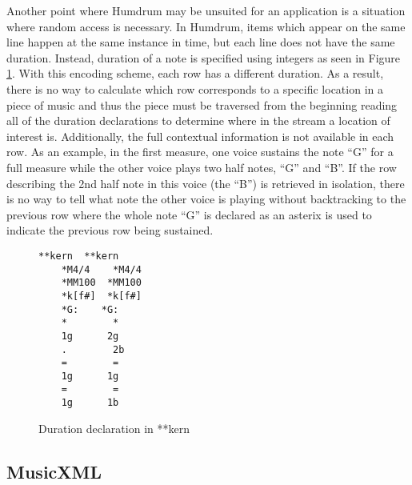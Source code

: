 Another point where Humdrum may be unsuited for an application is a situation where random access is necessary. In Humdrum, items which appear on the same line happen at the same instance in time, but each line does not have the same duration. Instead, duration of a note is specified using integers as seen in Figure \ref{fig:humdrumDuration}. With this encoding scheme, each row has a different duration. As a result, there is no way to calculate which row corresponds to a specific location in a piece of music and thus the piece must be traversed from the beginning reading all of the duration declarations to determine where in the stream a location of interest is. Additionally, the full contextual information is not available in each row. As an example, in the first measure, one voice sustains the note ``G'' for a full measure while the other voice plays two half notes, ``G'' and ``B''. If the row describing the 2nd half note in this voice (the ``B'') is retrieved in isolation, there is no way to tell what note the other voice is playing without backtracking to the previous row where the whole note ``G'' is declared as an asterix is used to indicate the previous row being sustained.

\begin{figure}
  \begin{center}
    \begin{Verbatim}[fontfamily=courier, xleftmargin=\parindent]
	**kern	**kern
	*M4/4	 *M4/4
	*MM100	*MM100
	*k[f#]	*k[f#]
	*G:	   *G:
	*	     *
	1g	    2g
	.	     2b
	=	     =
	1g	    1g
	=	     =
	1g	    1b
    \end{Verbatim}
    \caption{Duration declaration in **kern}
    \label{fig:humdrumDuration}
  \end{center}
\end{figure}

\subsection{MusicXML}